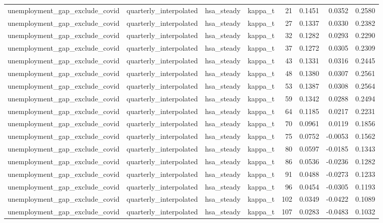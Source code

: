 \begin{tabular}{llllrrrr}
unemployment\_gap\_exclude\_covid & quarterly\_interpolated & hsa\_steady & kappa\_t & 21 & 0.1451 & 0.0352 & 0.2580 \\
unemployment\_gap\_exclude\_covid & quarterly\_interpolated & hsa\_steady & kappa\_t & 27 & 0.1337 & 0.0330 & 0.2382 \\
unemployment\_gap\_exclude\_covid & quarterly\_interpolated & hsa\_steady & kappa\_t & 32 & 0.1282 & 0.0293 & 0.2290 \\
unemployment\_gap\_exclude\_covid & quarterly\_interpolated & hsa\_steady & kappa\_t & 37 & 0.1272 & 0.0305 & 0.2309 \\
unemployment\_gap\_exclude\_covid & quarterly\_interpolated & hsa\_steady & kappa\_t & 43 & 0.1331 & 0.0316 & 0.2445 \\
unemployment\_gap\_exclude\_covid & quarterly\_interpolated & hsa\_steady & kappa\_t & 48 & 0.1380 & 0.0307 & 0.2561 \\
unemployment\_gap\_exclude\_covid & quarterly\_interpolated & hsa\_steady & kappa\_t & 53 & 0.1387 & 0.0308 & 0.2564 \\
unemployment\_gap\_exclude\_covid & quarterly\_interpolated & hsa\_steady & kappa\_t & 59 & 0.1342 & 0.0288 & 0.2494 \\
unemployment\_gap\_exclude\_covid & quarterly\_interpolated & hsa\_steady & kappa\_t & 64 & 0.1185 & 0.0217 & 0.2231 \\
unemployment\_gap\_exclude\_covid & quarterly\_interpolated & hsa\_steady & kappa\_t & 70 & 0.0961 & 0.0119 & 0.1856 \\
unemployment\_gap\_exclude\_covid & quarterly\_interpolated & hsa\_steady & kappa\_t & 75 & 0.0752 & -0.0053 & 0.1562 \\
unemployment\_gap\_exclude\_covid & quarterly\_interpolated & hsa\_steady & kappa\_t & 80 & 0.0597 & -0.0185 & 0.1343 \\
unemployment\_gap\_exclude\_covid & quarterly\_interpolated & hsa\_steady & kappa\_t & 86 & 0.0536 & -0.0236 & 0.1282 \\
unemployment\_gap\_exclude\_covid & quarterly\_interpolated & hsa\_steady & kappa\_t & 91 & 0.0488 & -0.0273 & 0.1233 \\
unemployment\_gap\_exclude\_covid & quarterly\_interpolated & hsa\_steady & kappa\_t & 96 & 0.0454 & -0.0305 & 0.1193 \\
unemployment\_gap\_exclude\_covid & quarterly\_interpolated & hsa\_steady & kappa\_t & 102 & 0.0349 & -0.0422 & 0.1089 \\
unemployment\_gap\_exclude\_covid & quarterly\_interpolated & hsa\_steady & kappa\_t & 107 & 0.0283 & -0.0483 & 0.1032 \\

\end{tabular}
